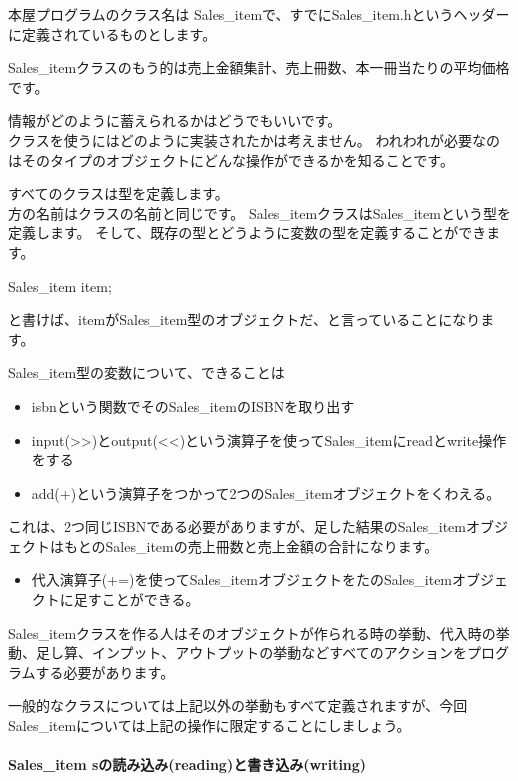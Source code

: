 \documentclass[11pt]{article}
\providecommand{\tightlist}{%
      \setlength{\itemsep}{0pt}\setlength{\parskip}{0pt}}
\begin{document}
本屋プログラムのクラス名は
Sales\_itemで、すでにSales\_item.hというヘッダーに定義されているものとします。

Sales\_itemクラスのもう的は売上金額集計、売上冊数、本一冊当たりの平均価格です。

情報がどのように蓄えられるかはどうでもいいです。\\
クラスを使うにはどのように実装されたかは考えません。
われわれが必要なのはそのタイプのオブジェクトにどんな操作ができるかを知ることです。

すべてのクラスは型を定義します。\\
方の名前はクラスの名前と同じです。
Sales\_itemクラスはSales\_itemという型を定義します。
そして、既存の型とどうように変数の型を定義することができます。

Sales\_item item;

と書けば、itemがSales\_item型のオブジェクトだ、と言っていることになります。

Sales\_item型の変数について、できることは

\begin{itemize}
\tightlist
\item
  isbnという関数でそのSales\_itemのISBNを取り出す
\item
  input(\textgreater{}\textgreater{})とoutput(\textless{}\textless{})という演算子を使ってSales\_itemにreadとwrite操作をする
\item
  add(+)という演算子をつかって2つのSales\_itemオブジェクトをくわえる。
\end{itemize}

これは、2つ同じISBNである必要がありますが、足した結果のSales\_itemオブジェクトはもとのSales\_itemの売上冊数と売上金額の合計になります。

\begin{itemize}
\tightlist
\item
  代入演算子(+=)を使ってSales\_itemオブジェクトをたのSales\_itemオブジェクトに足すことができる。
\end{itemize}

Sales\_itemクラスを作る人はそのオブジェクトが作られる時の挙動、代入時の挙動、足し算、インプット、アウトプットの挙動などすべてのアクションをプログラムする必要があります。

一般的なクラスについては上記以外の挙動もすべて定義されますが、今回Sales\_itemについては上記の操作に限定することにしましょう。

\paragraph{Sales\_item
sの読み込み(reading)と書き込み(writing)}\label{sales_item-sux306eux8aadux307fux8fbcux307freadingux3068ux66f8ux304dux8fbcux307fwriting}
\end{document}
